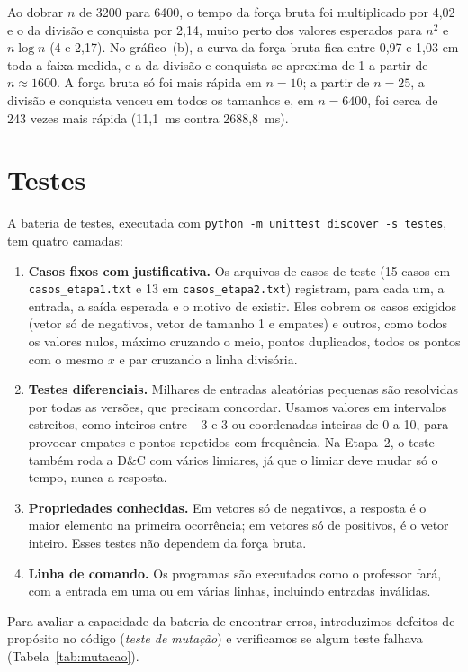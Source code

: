\documentclass[11pt,a4paper]{article}
\begin{document}
{Ao dobrar $n$ de 3200 para 6400, o tempo da força bruta foi multiplicado por 4,02 e o da divisão e conquista por 2,14, muito perto dos valores esperados para $n^2$ e $n\log n$ (4 e 2,17). No gráfico~(b), a curva da força bruta fica entre 0,97 e 1,03 em toda a faixa medida, e a da divisão e conquista se aproxima de 1 a partir de $n \approx 1600$. A força bruta só foi mais rápida em $n = 10$; a partir de $n = 25$, a divisão e conquista venceu em todos os tamanhos e, em $n = 6400$, foi cerca de 243 vezes mais rápida (11,1~ms contra 2688,8~ms).}

\section{Testes}

A bateria de testes, executada com \texttt{python -m unittest discover -s testes}, tem quatro camadas:

\begin{enumerate}
  \item \textbf{Casos fixos com justificativa.} Os arquivos de casos de teste (15 casos em \nolinkurl{casos_etapa1.txt} e 13 em \nolinkurl{casos_etapa2.txt}) registram, para cada um, a entrada, a saída esperada e o motivo de existir. Eles cobrem os casos exigidos (vetor só de negativos, vetor de tamanho 1 e empates) e outros, como todos os valores nulos, máximo cruzando o meio, pontos duplicados, todos os pontos com o mesmo $x$ e par cruzando a linha divisória.
  \item \textbf{Testes diferenciais.} Milhares de entradas aleatórias pequenas são resolvidas por todas as versões, que precisam concordar. Usamos valores em intervalos estreitos, como inteiros entre $-3$ e $3$ ou coordenadas inteiras de 0 a 10, para provocar empates e pontos repetidos com frequência. Na Etapa~2, o teste também roda a D\&C com vários limiares, já que o limiar deve mudar só o tempo, nunca a resposta.
  \item \textbf{Propriedades conhecidas.} Em vetores só de negativos, a resposta é o maior elemento na primeira ocorrência; em vetores só de positivos, é o vetor inteiro. Esses testes não dependem da força bruta.
  \item \textbf{Linha de comando.} Os programas são executados como o professor fará, com a entrada em uma ou em várias linhas, incluindo entradas inválidas.
\end{enumerate}

Para avaliar a capacidade da bateria de encontrar erros, introduzimos defeitos de propósito no código (\emph{teste de mutação}) e verificamos se algum teste falhava (Tabela~\ref{tab:mutacao}).
\end{document}
